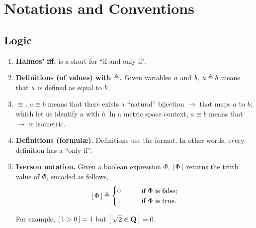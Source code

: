 \renewcommand{\labelenumi}{\arabic{enumi}.}
\chapter{Notations and Conventions}
\section*{Logic}
\begin{enumerate}
\item{{\bf Halmos' iff.} \iif is a short for ``if and only if".}
\item{{\bf Definitions (of values) with $\triangleq$.} Given variables %
$\mathit{a}$ and $\mathit{b}$, %
$a\triangleq b$ means that $\mathit{a}$ is defined as equal to $\mathit{b}$.}
\item{{\bf $\equiv$.} $a\equiv b$ means that there exists a ``natural'' %
bijection $\to$ that maps $a$ to $b$; which let us identify $a$ with $b$. %
In a metric space context, $a\equiv b$ means that $\to$ is isometric.}
\item{{\bf Definitions (formul\ae).} Definitions use the \iif format. %
In other words, every definition has a ``only if''. %
}
\item{{\bf Iverson notation.} Given a boolean expression $\Phi$, %
$\left[\,\Phi\,\right]$ returns the truth value of $\Phi$, encoded as follows, %
%
  \begin{align} \nonumber
    \left[\,\Phi\,\right]\triangleq 
    \begin{cases}
      0 & \quad\quad \text{if } \Phi \text{ is false;} \\
      1 & \quad\quad \text{if } \Phi \text{ is true.}
    \end{cases}
  \end{align}

For example, $\left[\,1 > 0\,\right] = 1$ but $\left[\, \sqrt{2} \in {\mathbf Q}\,\right] = 0$.
}
\end{enumerate}

